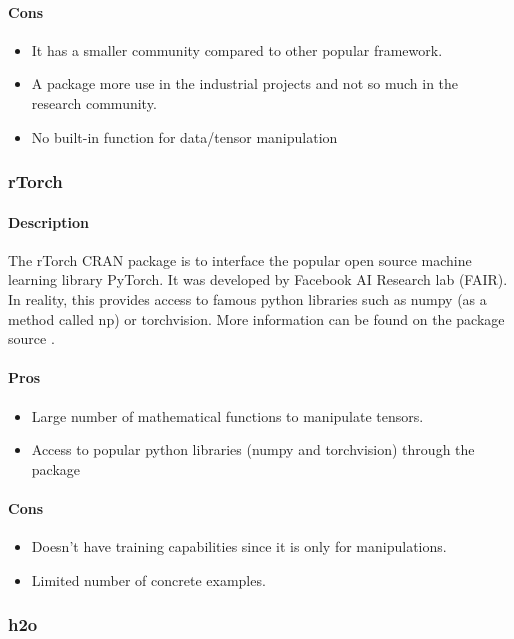 \documentclass[letter,8pt]{article}\usepackage[]{graphicx}\usepackage[]{color}
\begin{document}
\paragraph{Cons}
\begin{itemize}
\item It has a smaller community compared to other popular framework.
\item A package more use in the industrial projects and not so much in the research community.
\item No built-in function for data/tensor manipulation
\end{itemize}


\subsubsection{rTorch}
\paragraph{Description}
The rTorch CRAN package is to interface the popular open source machine learning library PyTorch. It was developed by Facebook AI Research lab (FAIR). In reality, this provides access to famous python libraries such as numpy (as a method called np) or torchvision. More information can be found on the package source \cite{rTorch2019}.
\paragraph{Pros}
\begin{itemize}
\item Large number of mathematical functions to manipulate tensors.
\item Access to popular python libraries (numpy and torchvision) through the package
\end{itemize}
\paragraph{Cons}
\begin{itemize}
\item Doesn't have training capabilities since it is only for manipulations.
\item Limited number of concrete examples.
\end{itemize}
\subsubsection{h2o}
\end{document}
